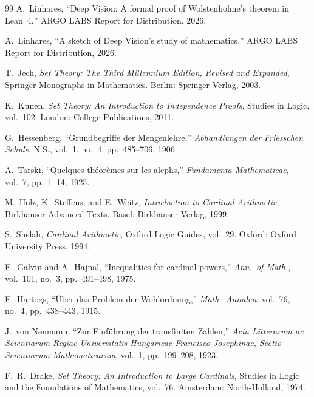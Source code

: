 \documentclass[11pt]{article}
\theoremstyle{definition}
\theoremstyle{remark}
\begin{document}
\begin{thebibliography}{99}
A.~Linhares,
``Deep Vision: A formal proof of Wolstenholme's theorem in Lean~4,''
ARGO LABS Report for Distribution, 2026.

A.~Linhares,
``A sketch of Deep Vision's study of mathematics,''
ARGO LABS Report for Distribution, 2026.

T.~Jech,
\emph{Set Theory: The Third Millennium Edition, Revised and Expanded},
Springer Monographs in Mathematics.
Berlin: Springer-Verlag, 2003.

K.~Kunen,
\emph{Set Theory: An Introduction to Independence Proofs},
Studies in Logic, vol.~102.
London: College Publications, 2011.

G.~Hessenberg,
``Grundbegriffe der Mengenlehre,''
\emph{Abhandlungen der Friesschen Schule}, N.S., vol.~1, no.~4,
pp.~485--706, 1906.

A.~Tarski,
``Quelques th\'eor\`emes sur les alephs,''
\emph{Fundamenta Mathematicae}, vol.~7, pp.~1--14, 1925.

M.~Holz, K.~Steffens, and E.~Weitz,
\emph{Introduction to Cardinal Arithmetic},
Birkh\"auser Advanced Texts.
Basel: Birkh\"auser Verlag, 1999.

S.~Shelah,
\emph{Cardinal Arithmetic},
Oxford Logic Guides, vol.~29.
Oxford: Oxford University Press, 1994.

F.~Galvin and A.~Hajnal,
``Inequalities for cardinal powers,''
\emph{Ann.\ of Math.}, vol.~101, no.~3, pp.~491--498, 1975.

F.~Hartogs,
``\"Uber das Problem der Wohlordnung,''
\emph{Math.\ Annalen}, vol.~76, no.~4, pp.~438--443, 1915.

J.~von Neumann,
``Zur Einf\"uhrung der transfiniten Zahlen,''
\emph{Acta Litterarum ac Scientiarum Regiae Universitatis
Hungaricae Francisco-Josephinae, Sectio Scientiarum
Mathematicarum}, vol.~1, pp.~199--208, 1923.

F.~R.~Drake,
\emph{Set Theory: An Introduction to Large Cardinals},
Studies in Logic and the Foundations of Mathematics, vol.~76.
Amsterdam: North-Holland, 1974.

\end{thebibliography}

\newpage
\appendix
\end{document}
